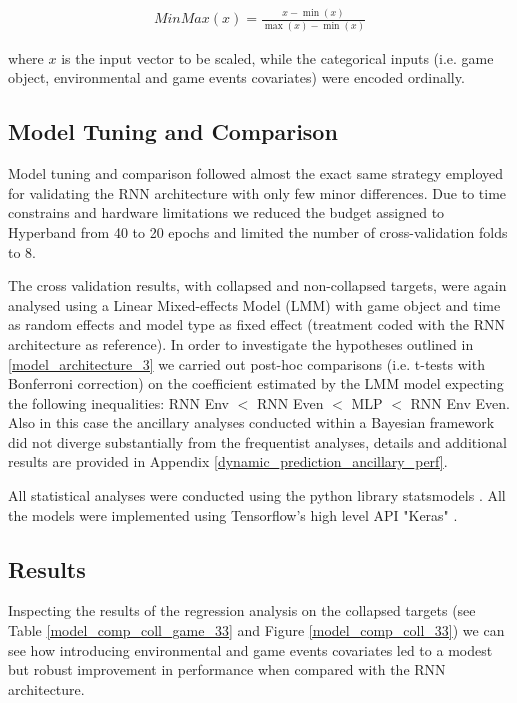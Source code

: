 \begin{equation}
  \begin{gathered} 
  \label{min_max}
        MinMax(x) =\frac{x - \min(x)} {\max(x) - \min(x)} 
  \end{gathered}
\end{equation}

where $x$ is the input vector to be scaled, while the categorical inputs (i.e. game object, environmental and game events covariates) were encoded ordinally.

\subsection{Model Tuning and Comparison}
\label{tuning_comparison_3}
Model tuning and comparison followed almost the exact same strategy employed for validating the RNN architecture with only few minor differences. Due to time constrains and hardware limitations we reduced the budget assigned to Hyperband from 40 to 20 epochs and limited the number of cross-validation folds to 8. 

The cross validation results, with collapsed and non-collapsed targets, were again analysed using a Linear Mixed-effects Model (LMM) with game object and time as random effects and model type as fixed effect (treatment coded with the RNN architecture as reference). In order to investigate the hypotheses outlined in \ref{model_architecture_3} we carried out post-hoc comparisons (i.e. t-tests with Bonferroni correction) on the coefficient estimated by the LMM model expecting the following inequalities: RNN Env $<$ RNN Even $<$ MLP $<$ RNN Env Even. Also in this case the ancillary analyses conducted within a Bayesian framework did not diverge substantially from the frequentist analyses, details and additional results are provided in Appendix \ref{dynamic_prediction_ancillary_perf}. 

All statistical analyses were conducted using the python library statsmodels \cite{seabold2010statsmodels}.  All the models were implemented using Tensorflow's high level API "Keras" \cite{tensorflow2015-whitepaper,chollet2015keras}. 

\subsection{Results}
\label{results_3}
Inspecting the results of the regression analysis on the collapsed targets (see Table \ref{model_comp_coll_game_33} and Figure \ref{model_comp_coll_33}) we can see how introducing environmental and game events covariates led to a modest but robust improvement in performance when compared with the RNN architecture. 

